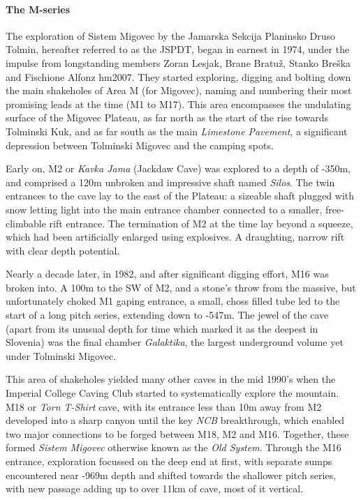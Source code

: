 \paragraph{The M-series} The exploration of Sistem Migovec by the Jamarska Sekcija Planinsko Druso Tolmin, hereafter referred to as the JSPDT, began in earnest in 1974, under the impulse from longstanding members Zoran Lesjak, Brane Bratuž, Stanko Breška and Fischione Alfonz hm2007. They started exploring, digging and bolting down the main shakeholes of Area M (for Migovec), naming and numbering their most promising leads at the time (M1 to M17). This area encompasses the undulating surface of the Migovec Plateau, as far north as the start of the rise towards Tolminski Kuk, and as far south as the main \emph{Limestone Pavement}, a significant depression between Tolminski Migovec and the camping spots.



Early on, M2 or \emph{Kavka Jama} (Jackdaw Cave) was explored to a depth of -350m, and comprised a 120m unbroken and impressive shaft named \emph{Silos}. The twin entrances to the cave lay to the east of the Plateau: a sizeable shaft plugged with snow letting light into the main entrance chamber connected to a smaller, free-climbable rift entrance. The termination of M2 at the time lay beyond a squeeze, which had been artificially enlarged using explosives. A draughting, narrow rift with clear depth potential.

Nearly a decade later, in 1982, and after significant digging effort, M16 was broken into. A 100m to the SW of M2, and a stone's throw from the massive, but unfortunately choked M1 gaping entrance, a small, choss filled tube led to the start of a long pitch series, extending down to -547m. The jewel of the cave (apart from its unusual depth for time which marked it as the deepest in Slovenia) was the final chamber \emph{Galaktika}, the largest underground volume yet under Tolminski Migovec. 



This area of shakeholes yielded many other caves in the mid 1990's when the Imperial College Caving Club started to systematically explore the mountain. M18 or \emph{Torn T-Shirt} cave, with its entrance less than 10m away from M2 developed into a sharp canyon until the key \emph{NCB} breakthrough, which enabled two major connections to be forged between M18, M2 and M16. Together, these formed \emph{Sistem Migovec} otherwise known as the \emph{Old System}. Through the M16 entrance, exploration focussed on the deep end at first, with separate sumps encountered near -969m depth and shifted towards the shallower pitch series, with new passage adding up to over 11km of cave, most of it vertical.



